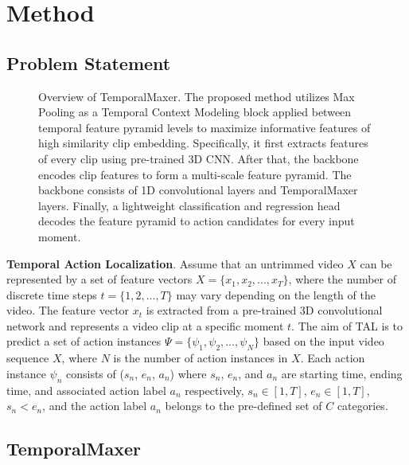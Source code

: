 \documentclass[10pt,twocolumn,letterpaper]{article}
\begin{document}
 \section{Method}
\subsection{Problem Statement}
\begin{figure*}[t]
\centering
\begin{center}
\end{center}
\caption{Overview of TemporalMaxer. The proposed method utilizes Max Pooling as a Temporal Context Modeling block applied between temporal feature pyramid levels to maximize informative features of high similarity clip embedding. Specifically, it first extracts features of every clip using pre-trained 3D CNN. After that, the backbone encodes clip features to form a multi-scale feature pyramid. The backbone consists of 1D convolutional layers and TemporalMaxer layers. Finally, a lightweight classification and regression head decodes the feature pyramid to action candidates for every input moment.}
\label{fig:architecture}
\end{figure*}

\textbf{Temporal Action Localization}. Assume that an untrimmed video $X$ can be represented by a set of feature vectors $X = \lbrace{x_1, x_2, . . . , x_T }\rbrace$, where the number of discrete time steps $t = \lbrace{1, 2, . . . , T}\rbrace$ may vary depending on the length of the video. The feature vector $x_t$ is extracted from a pre-trained 3D convolutional network and represents a video clip at a specific moment $t$. The aim of TAL is to predict a set of action instances $\Psi = \{\psi_1, \psi_2, \ldots, \psi_N \}$ based on the input video sequence $X$, where $N$ is the number of action instances in $X$. Each action instance $\psi_n$ consists of ($s_n$, $e_n$, $a_n$) where $s_n$, $e_n$, and $a_n$ are starting time, ending time, and associated action label $a_n$ respectively, $s_n \in [1, T]$, $e_n \in [1, T]$, $s_n < e_n$, and the action label $a_n$ belongs to the pre-defined set of $C$ categories.



\subsection{TemporalMaxer}
\end{document}
